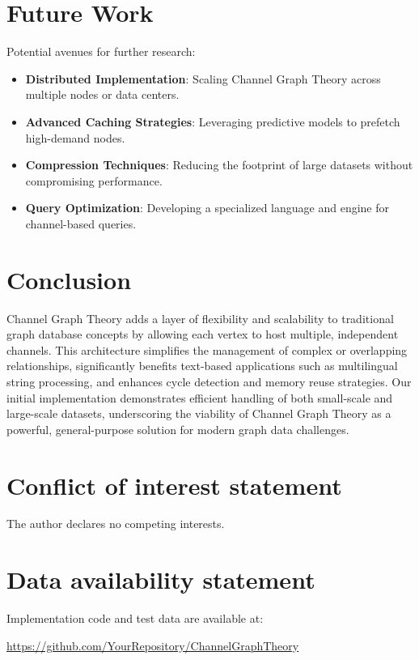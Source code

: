 \documentclass[12pt, a4paper]{article}
\begin{document}
\section{Future Work}\label{Sec:Future}
Potential avenues for further research:
\begin{itemize}
    \item \textbf{Distributed Implementation}: Scaling Channel Graph Theory across multiple nodes or data centers.
    \item \textbf{Advanced Caching Strategies}: Leveraging predictive models to prefetch high-demand nodes.
    \item \textbf{Compression Techniques}: Reducing the footprint of large datasets without compromising performance.
    \item \textbf{Query Optimization}: Developing a specialized language and engine for channel-based queries.
\end{itemize}

\section{Conclusion}\label{Sec:Conclusion}
Channel Graph Theory adds a layer of flexibility and scalability to traditional graph database concepts by allowing each vertex to host multiple, independent channels. This architecture simplifies the management of complex or overlapping relationships, significantly benefits text-based applications such as multilingual string processing, and enhances cycle detection and memory reuse strategies. Our initial implementation demonstrates efficient handling of both small-scale and large-scale datasets, underscoring the viability of Channel Graph Theory as a powerful, general-purpose solution for modern graph data challenges.

\section*{Conflict of interest statement}
The author declares no competing interests.

\section*{Data availability statement}
Implementation code and test data are available at:
\begin{center}
\url{https://github.com/YourRepository/ChannelGraphTheory}
\end{center}



\end{document}

